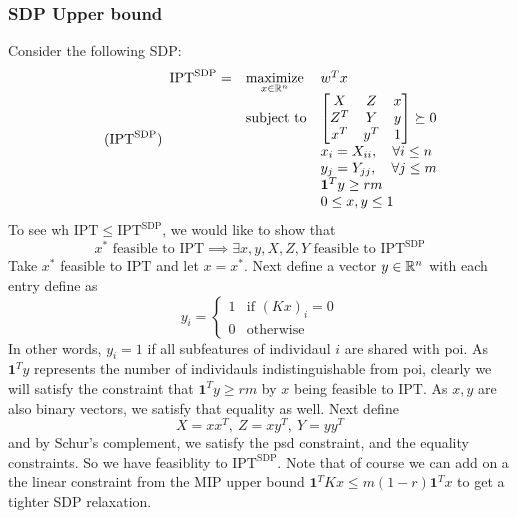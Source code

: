 \documentclass[12pt]{article}
\newcommand{\priv}{\text{IPT}}
\newcommand{\privsdp}{\text{IPT}^\text{SDP}}
\begin{document}
\subsubsection{SDP Upper bound}
Consider the following SDP:
\begin{equation}
	\label{eq:privsdp} 
    \tag{$\privsdp$} 
	\begin{array}{lll}
		\privsdp = & \underset{x\in\mr^n}{\text{maximize}} & w^T x \\
		& \mbox{subject to} &  
        \begin{bmatrix}
            \begin{matrix}
                X
            \end{matrix}  & 
            \begin{matrix}
                Z
            \end{matrix} & x \\
            \begin{matrix}
                Z^T 
            \end{matrix} & 
            \begin{matrix}
                Y 
            \end{matrix} & y \\
            x^T & y^T & 1
        \end{bmatrix} \succeq 0\\
        && x_i = X_{ii}, \quad \forall i\leq n\\
        && y_j = Y_{jj}, \quad \forall j \leq m\\
        && \mathbf{1}^Ty \geq rm \\
        && 0 \leq x,y \leq 1
		\end{array}
\end{equation}
To see wh $\priv \leq \privsdp$, we would like to show that
\[x^* \text{ feasible to } \priv \implies \exists x,y,X,Z,Y \text{ feasible to }\privsdp\] 
Take $x^*$ feasible to $\priv$ and let $x = x^*$. Next define a vector $y \in \mathbb{R}^n$ with each entry define as
\[y_i = \begin{cases}
    1 & \text{if } (Kx)_i = 0 \\
    0 & \text{otherwise}
\end{cases}\]
In other words, $y_i = 1$ if all subfeatures of individaul $i$ are shared with \gls{poi}. As $\mathbf{1}^Ty$ represents the number of individauls indistinguishable from \gls{poi}, clearly we will satisfy the constraint that $\mathbf{1}^Ty \geq rm$ by $x$ being feasible to $\priv$. As $x,y$ are also binary vectors, we satisfy that equality as well. Next define \[X = xx^T, \ Z = xy^T, \ Y = yy^T\]
and by Schur's complement, we satisfy the psd constraint, and the equality constraints. So we have feasiblity to $\privsdp$. Note that of course we can add on a the linear constraint from the MIP upper bound $\mathbf{1}^TKx \leq m(1-r)\mathbf{1}^Tx$ to get a tighter SDP relaxation.
\end{document}
